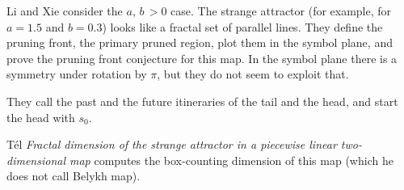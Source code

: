 {Li and Xie consider the
\(
a,\, b\, > 0
\)
case. The strange attractor (for example, for $a = 1.5$ and $b = 0.3$)
looks like a fractal set of parallel lines.
They define the pruning front, the primary pruned region, plot them in
the symbol plane, and prove the pruning front conjecture  for this map.
In the symbol plane there is a symmetry under rotation by $\pi$, but they
do not seem to exploit that.

They call the past and the future itineraries of the tail and the head,
and start the head with $s_0$.

T{\'{e}}l {\em Fractal dimension of the strange attractor in a
piecewise linear two-dim\-en\-si\-on\-al map} computes the box-counting dimension
of this map (which he does not call Belykh map).
    } %
